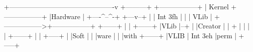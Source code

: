 \begin{DoxyCode}
             +----------------------------------------------v
     +---------+                                         +-----------------+
     |  Kernel +-----------------+                       |Hardware         |
     +----^--^-+             +---v--+                    |                 |
  Int 3fh |  |               | VLib | +----------------->+-----------------+
+------+  |  |               +------+
|VLib  |--+  |
|Creator     |
|      +     |
|      |     |
+------+     |
             |
+-----+      |
|Soft |      |
|ware |      |
|with +------+
|VLIB |  Int 3eh
|perm |
+-----+
\end{DoxyCode}
 